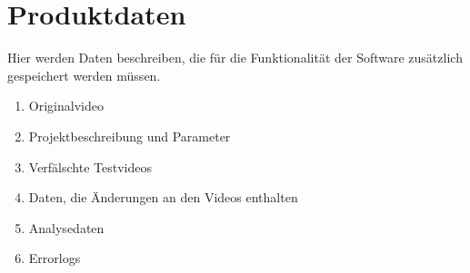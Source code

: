\documentclass[]{book}
\begin{document}
\chapter{Produktdaten}
	Hier werden Daten beschreiben,  die für die Funktionalität der Software zusätzlich gespeichert werden müssen.
		\begin{enumerate}
			\item Originalvideo
			\item Projektbeschreibung und Parameter
			\item Verfälschte Testvideos
			\item Daten, die Änderungen an den Videos enthalten
			\item Analysedaten
			\item Errorlogs
		\end{enumerate}
\end{document}
